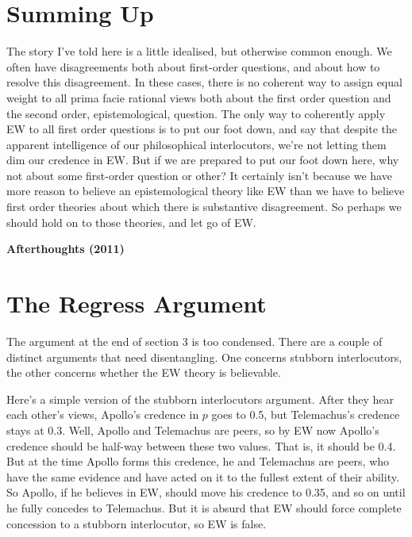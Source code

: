 \section{Summing Up}
The story I've told here is a little idealised, but otherwise common enough. We often have disagreements both about first-order questions, and about how to resolve this disagreement. In these cases, there is no coherent way to assign equal weight to all prima facie rational views both about the first order question and the second order, epistemological, question. The only way to coherently apply EW to all first order questions is to put our foot down, and say that despite the apparent intelligence of our philosophical interlocutors, we're not letting them dim our credence in EW. But if we are prepared to put our foot down here, why not about some first-order question or other? It certainly isn't because we have more reason to believe an epistemological theory like EW than we have to believe first order theories about which there is substantive disagreement. So perhaps we should hold on to those theories, and let go of EW. 

\begin{Large}
\begin{center}
\textbf{Afterthoughts (2011)}
\end{center}
\end{Large}

\section{The Regress Argument}

The argument at the end of section 3 is too condensed. There are a couple of distinct arguments that need disentangling. One concerns stubborn interlocutors, the other concerns whether the EW theory is believable.

Here's a simple version of the stubborn interlocutors argument. After they hear each other's views, Apollo's credence in $p$ goes to 0.5, but Tele\-machus's credence stays at 0.3. Well, Apollo and Telemachus are peers, so by EW now Apollo's credence should be half-way between these two values. That is, it should be 0.4. But at the time Apollo forms this credence, he and Telemachus are peers, who have the same evidence and have acted on it to the fullest extent of their ability. So Apollo, if he believes in EW, should move his credence to 0.35, and so on until he fully concedes to Telemachus. But it is absurd that EW should force complete concession to a stubborn interlocutor, so EW is false.

